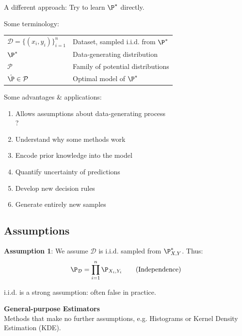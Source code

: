 A different approach: Try to learn $\P^*$ directly.\\

Some terminology:

\begin{tabular}{ll}
    $\mathcal{D} = \bigl\{ (x_i,y_i) \bigr\}_{i=1}^n$   & Dataset, sampled i.i.d. from $\P^*$      \\
    $\P^*$                                              & Data-generating distribution      \\
    $\mathcal{P}$                                       & Family of potential distributions \\
    $\hat{\P} \in \mathcal{P}$                          & Optimal model of $\P^*$
\end{tabular}

Some advantages \& applications:
\begin{enumerate}
    \item Allows assumptions about data-generating process\\
    ?
    \item Understand why some methods work\\
    \item Encode prior knowledge into the model
    \item Quantify uncertainty of predictions
    \item Develop new decision rules
    \item Generate entirely new samples
\end{enumerate}

\subsection{Assumptions}

\textbf{Assumption 1}: We assume $\mathcal{D}$ is i.i.d. sampled from $\P^*_{X,Y}$. Thus:
$$
    \P_\mathcal{D} = \prod_{i=1}^n \P_{X_i,Y_i} \qquad \text{(Independence)}
$$

\remark i.i.d. is a strong assumption: often false in practice.\\

\method \textbf{General-purpose Estimators}\\
Methods that make no further assumptions, e.g. Histograms or Kernel Density Estimation (KDE).\\

